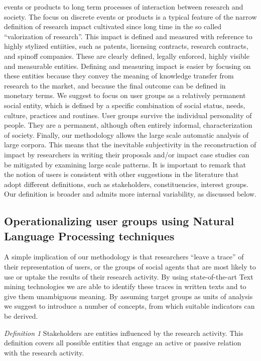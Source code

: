 \documentclass[]{book}
\begin{document}
events or products to long term processes of interaction between
research and society. The focus on discrete events or products is a
typical feature of the narrow definition of research impact cultivated
since long time in the so called ``valorization of research''. This
impact is defined and measured with reference to highly stylized
entiities, such as patents, licensing contracts, research contracts, and
spinoff companies. These are clearly defined, legally enforced, highly
visible and measurable entities. Defining and measuring impact is easier
by focusing on these entities because they convey the meaning of
knowledge transfer from research to the market, and because the final
outcome can be defined in monetary terms. We suggest to focus on user
groups as a relatively permanent social entity, which is defined by a
specific combination of social status, needs, culture, practices and
routines. User groups survive the individual personality of people. They
are a permanent, although often entirely informal, characterization of
society. Finally, our methodology allows the large scale automatic
analysis of large corpora. This means that the inevitable subjectivity
in the reconstruction of impact by researchers in writing their
proposals and/or impact case studies can be mitigated by examining large
scale patterns. It is important to remark that the notion of users is
consistent with other suggestions in the literature that adopt different
definitions, such as stakeholders, constituencies, interest groups. Our
definition is broader and admits more internal variability, as discussed
below.

\subsection{Operationalizing user groups using Natural Language
Processing
techniques}\label{operationalizing-user-groups-using-natural-language-processing-techniques}

A simple implication of our methodology is that researchers ``leave a
trace'' of their representation of users, or the groups of social agents
that are most likely to use or uptake the results of their research
activity. By using state-of-the-art Text mining technologies we are able
to identify these traces in written texts and to give them unambiguous
meaning. By assuming target groups as units of analysis we suggest to
introduce a number of concepts, from which suitable indicators can be
derived.

\emph{Definition 1} Stakeholders are entities influenced by the research
activity. This definition covers all possible entities that engage an
active or passive relation with the research activity.
\end{document}
